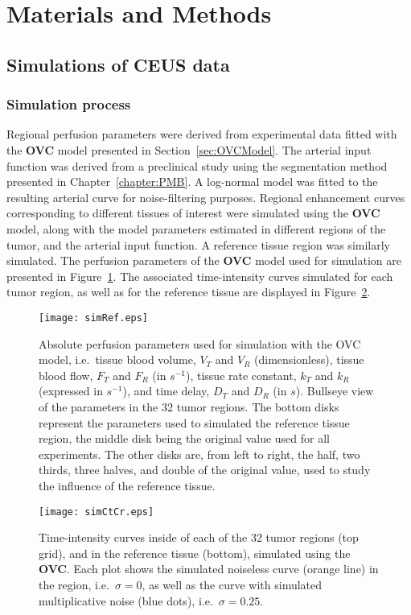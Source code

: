 \section{Materials and Methods}
\subsection{Simulations of CEUS data}
\subsubsection{Simulation process}
Regional perfusion parameters were derived from experimental data fitted with the \textbf{OVC} model presented in Section~\ref{sec:OVCModel}.
The arterial input function was derived from a preclinical study using the segmentation method presented in Chapter~\ref{chapter:PMB}.
A log-normal model was fitted to the resulting arterial curve for noise-filtering purposes. 
Regional enhancement curves corresponding to different tissues of interest were simulated using the \textbf{OVC} model, along with the model parameters estimated in different regions of the tumor, and the arterial input function.
A reference tissue region was similarly simulated.
The perfusion parameters of the \textbf{OVC} model used for simulation are presented in Figure~\ref{fig:simRef}.
The associated time-intensity curves simulated for each tumor region, as well as for the reference tissue are displayed in Figure~\ref{fig:simCtCr}.

\begin{figure}[bh]
\texttt{[image: simRef.eps]}
\caption{Absolute perfusion parameters used for simulation with the OVC model, i.e.~tissue blood volume, $V_T$ and $V_R$ (dimensionless), tissue blood flow, $F_T$ and $F_R$ (in $s^{-1}$), tissue rate constant, $k_T$ and $k_R$ (expressed in $s^{-1}$), and time delay, $D_T$ and $D_R$ (in $s$). Bullseye view of the parameters in the 32 tumor regions. The bottom disks represent the parameters used to simulated the reference tissue region, the middle disk being the original value used for all experiments. The other disks are, from left to right, the half, two thirds, three halves, and double of the original value, used to study the influence of the reference tissue.}
\label{fig:simRef}
\end{figure}

\begin{figure}
\texttt{[image: simCtCr.eps]}
\caption{Time-intensity curves inside of each of the 32 tumor regions (top grid), and in the reference tissue (bottom), simulated using the \textbf{OVC}. Each plot shows the simulated noiseless curve (orange line) in the region, i.e.~$\sigma = 0$, as well as the curve with simulated multiplicative noise (blue dots), i.e.~$\sigma = 0.25$.}
\label{fig:simCtCr}
\end{figure}
\FloatBarrier

